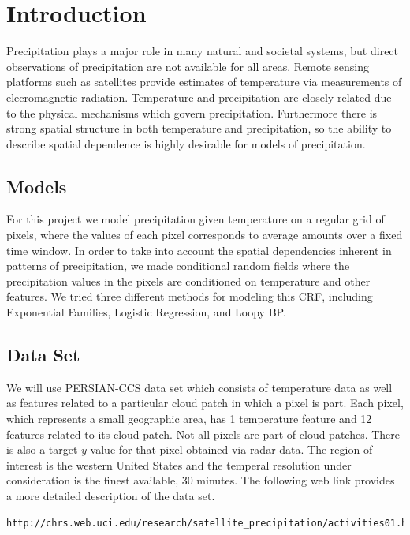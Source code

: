 
\section{Introduction}
Precipitation plays a major role in many natural and societal systems, but direct observations of precipitation are not available for all areas. Remote sensing platforms such as satellites provide estimates of temperature via measurements of elecromagnetic radiation. Temperature and precipitation are closely related due to the physical mechanisms which govern precipitation. Furthermore there is strong spatial structure in both temperature and precipitation, so the ability to describe spatial dependence is highly desirable for models of precipitation. 

\subsection{Models}

For this project we model precipitation given temperature on a regular grid of pixels, where the values of each pixel corresponds to average amounts over a fixed time window. In order to take into account the spatial dependencies inherent in patterns of precipitation, we made conditional random fields where the precipitation values in the pixels are conditioned on temperature and other features. We tried three different methods for modeling this CRF, including Exponential Families, Logistic Regression, and Loopy BP. 

\subsection{Data Set}
We will use PERSIAN-CCS data set which consists of temperature data as well as features related to a particular cloud patch in which a pixel is part. Each pixel, which represents a small geographic area, has 1 temperature feature and 12 features related to its cloud patch. Not all pixels are part of cloud patches. There is also a target $y$ value for that pixel obtained via radar data. The region of interest is the western United States and the temperal resolution under consideration is the finest available, 30 minutes. The following web link provides a more detailed description of the data set. \cite{persianccs}

\begin{lstlisting}
http://chrs.web.uci.edu/research/satellite_precipitation/activities01.html
\end{lstlisting}

